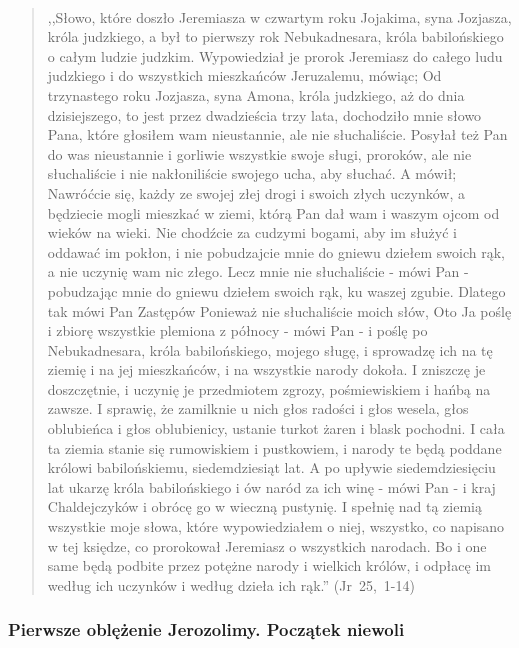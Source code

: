 \documentclass[10pt,a4paper,oneside]{article}
\begin{document}
\paragraph{}
\begin{quote}
,,Słowo, które doszło Jeremiasza w czwartym roku Jojakima, syna Jozjasza, króla judzkiego, a był to pierwszy rok Nebukadnesara, króla babilońskiego o całym ludzie judzkim. Wypowiedział je prorok Jeremiasz do całego ludu judzkiego i do wszystkich mieszkańców Jeruzalemu, mówiąc; Od trzynastego roku Jozjasza, syna Amona, króla judzkiego, aż do dnia dzisiejszego, to jest przez dwadzieścia trzy lata, dochodziło mnie słowo Pana, które głosiłem wam nieustannie, ale nie słuchaliście. Posyłał też Pan do was nieustannie i gorliwie wszystkie swoje sługi, proroków, ale nie słuchaliście i nie nakłoniliście swojego ucha, aby słuchać. A mówił; Nawróćcie się, każdy ze swojej złej drogi i swoich złych uczynków, a będziecie mogli mieszkać w ziemi, którą Pan dał wam i waszym ojcom od wieków na wieki. Nie chodźcie za cudzymi bogami, aby im służyć i oddawać im pokłon, i nie pobudzajcie mnie do gniewu dziełem swoich rąk, a nie uczynię wam nic złego. Lecz mnie nie słuchaliście - mówi Pan - pobudzając mnie do gniewu dziełem swoich rąk, ku waszej zgubie. Dlatego tak mówi Pan Zastępów Ponieważ nie słuchaliście moich słów, Oto Ja poślę i zbiorę wszystkie plemiona z północy - mówi Pan - i poślę po Nebukadnesara, króla babilońskiego, mojego sługę, i sprowadzę ich na tę ziemię i na jej mieszkańców, i na wszystkie narody dokoła. I zniszczę je doszczętnie, i uczynię je przedmiotem zgrozy, pośmiewiskiem i hańbą na zawsze. I sprawię, że zamilknie u nich głos radości i głos wesela, głos oblubieńca i głos oblubienicy, ustanie turkot żaren i blask pochodni. I cała ta ziemia stanie się rumowiskiem i pustkowiem, i narody te będą poddane królowi babilońskiemu, siedemdziesiąt lat. A po upływie siedemdziesięciu lat ukarzę króla babilońskiego i ów naród za ich winę - mówi Pan - i kraj Chaldejczyków i obrócę go w wieczną pustynię. I spełnię nad tą ziemią wszystkie moje słowa, które wypowiedziałem o niej, wszystko, co napisano w tej księdze, co prorokował Jeremiasz o wszystkich narodach. Bo i one same będą podbite przez potężne narody i wielkich królów, i odpłacę im według ich uczynków i według dzieła ich rąk.'' \mbox{(Jr 25, 1-14)}
\end{quote}
\subsubsection{Pierwsze oblężenie Jerozolimy. Początek niewoli}
\end{document}
